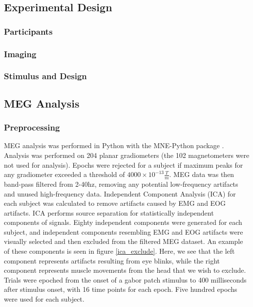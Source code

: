 \documentclass[../main.tex]{subfiles}
\begin{document}
\subsection{Experimental Design}
\subsubsection{Participants}

\subsubsection{Imaging}

\subsubsection{Stimulus and Design}

\subsection{MEG Analysis}
\subsubsection{Preprocessing}
MEG analysis was performed in Python with the MNE-Python package \citep{mne}. Analysis was performed on 204 planar gradiometers (the 102 magnetometers were not used for analysis). Epochs were rejected for a subject if maximum peaks for any gradiometer exceeded a threshold of $4000\times10^{-13}  \frac{T}{m}$. MEG data was then band-pass filtered from 2-40hz, removing any potential low-frequency artifacts and unused high-frequency data. Independent Component Analysis (ICA) for each subject was calculated to remove artifacts caused by EMG and EOG artifacts. ICA performs source separation for statistically independent components of signals. Eighty independent components were generated for each subject, and independent components resembling EMG and EOG artifacts were visually selected and then excluded from the filtered MEG dataset. An example of these components is seen in figure \ref{ica_exclude}. Here, we see that the left component represents artifacts resulting from eye blinks, while the right component represents muscle movements from the head that we wish to exclude. Trials were epoched from the onset of a gabor patch stimulus to 400 milliseconds after stimulus onset, with 16 time points for each epoch. Five hundred epochs were used for each subject.
\end{document}
